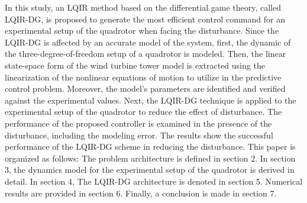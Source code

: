 \documentclass[conference]{IEEEtran}
\begin{document}
     In this study, an LQIR method based on the differential game theory, called LQIR-DG, is proposed to generate the most efficient control command for an experimental setup of the quadrotor when facing the disturbance. Since the LQIR-DG is affected by an accurate model of the system, first, the dynamic of the three-degree-of-freedom setup of a quadrotor is modeled. Then, the linear state-space form of the wind turbine tower model is extracted using the linearization of the nonlinear equations of motion to utilize in the predictive control problem. Moreover, the model's parameters are identified and verified against the experimental values. Next, the LQIR-DG technique is applied to the experimental setup of the quadrotor to reduce the effect of disturbance. The performance of the proposed controller is examined in the presence of the disturbance, including the modeling error. The results show the successful performance of the LQIR-DG scheme in reducing the disturbance.
     This paper is organized as follows: The problem architecture is defined in section 2. In section 3, the dynamics model for the experimental setup of the quadrotor is derived in detail. In section 4, The LQIR-DG architecture is denoted in section 5. Numerical results are provided in section 6. Finally, a conclusion is made in section 7.
\end{document}
